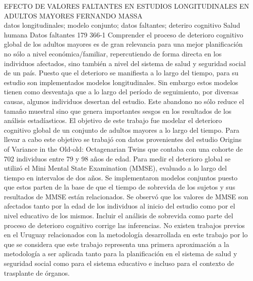 \A
{EFECTO DE VALORES FALTANTES EN ESTUDIOS LONGITUDINALES EN ADULTOS MAYORES}
{FERNANDO MASSA}
{
\\
}
{datos longitudinales; modelo conjunto; datos faltantes; deteriro cognitivo} 
 {Salud humana} 
 {Datos faltantes} 
 {179} 
 {366-1}
{Comprender el proceso de deterioro cognitivo global de los adultos mayores es de gran relevancia para una mejor planificación no sólo a nivel económica/familiar, repercutiendo de forma directa en los individuos afectados, sino también a nivel del sistema de salud y seguridad social de un país. Puesto que el deterioro se manifiesta a lo largo del tiempo, para su estudio son implementados modelos longitudinales. Sin embargo estos modelos tienen como desventaja que a lo largo del período de seguimiento, por diversas causas, algunos individuos desertan del estudio. Este abandono no sólo reduce el tamaño muestral sino que genera importantes sesgos en los resultados de los análisis estadíasticos. El objetivo de este trabajo fue modelar el deterioro cognitivo global de un conjunto de adultos mayores a lo largo del tiempo. Para llevar a cabo este objetivo se trabajó con datos provenientes del estudio Origins of Variance in the Old-old: Octagenarian Twins que contaba con una cohorte de 702 individuos entre 79 y 98 años de edad. Para medir el deterioro global se utilizó el Mini Mental State Examination (MMSE), evaluado a lo largo del tiempo en intervalos de dos años. Se implementaron modelos conjuntos puesto que estos parten de la base de que el tiempo de sobrevida de los sujetos y sus resultados de MMSE están relacionados. Se observó que los valores de MMSE son afectados tanto por la edad de los individuos al inicio del estudio como por el nivel educativo de los mismos. Incluir el análisis de sobrevida como parte del proceso de deterioro cognitivo corrige las inferencias. No existen trabajos previos en el Uruguay relacionados con la metodología desarrollada en este trabajo por lo que se considera que este trabajo representa una primera aproximación a la metodología a ser aplicada tanto para la planificación en el sistema de salud y seguridad social como para el sistema educativo e incluso para el contexto de trasplante de órganos.}

